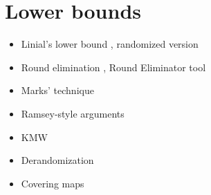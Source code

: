 \documentclass[a4paper,11pt]{article}
\begin{document}
\section{Lower bounds}
\begin{itemize}
    \item Linial's lower bound \cite{linial-1992-locality-in-distributed-graph-algorithms}, randomized version \cite{naor-1991-a-lower-bound-on-probabilistic-algorithms-for}
    \item Round elimination \cite{brandt-2019-an-automatic-speedup-theorem-for,brandt-fischer-etal-2016-a-lower-bound-for-the}, Round Eliminator tool \cite{olivetti-2020-brief-announcement-round-eliminator-a,olivetti-2025-round-eliminator-a-tool-for-automatic}
    \item Marks' technique \cite{marks-2016-a-determinacy-approach-to-borel,brandt-chang-etal-2022-local-problems-on-trees-from-the}
    \item Ramsey-style arguments \cite{naor-stockmeyer-1995-what-can-be-computed-locally,czygrinow-hanckowiak-wawrzyniak-2008-fast-distributed}
    \item KMW \cite{kuhn-moscibroda-wattenhofer-2004-what-cannot-be,kuhn-moscibroda-wattenhofer-2006-the-price-of-being,kuhn-moscibroda-wattenhofer-2016-local-computation,coupette-lenzen-2021-a-breezing-proof-of-the-kmw-bound}
    \item Derandomization \cite{naor-stockmeyer-1995-what-can-be-computed-locally,chang-kopelowitz-pettie-2019-an-exponential-separation,dahal-d-amore-etal-2023-brief-announcement-distributed}
    \item Covering maps \cite{angluin-1980-local-and-global-properties-in-networks-of,yamashita-kameda-1996-computing-on-anonymous-networks}
\end{itemize}
\end{document}
